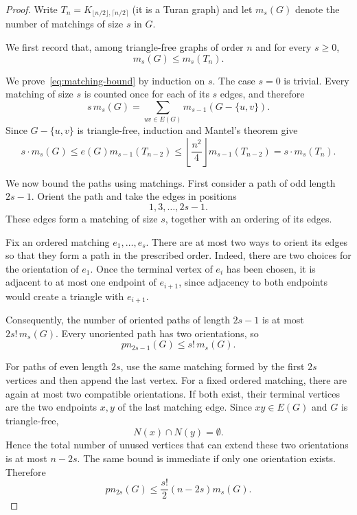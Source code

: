 \documentclass[10pt,a4paper]{amsart}
\newcommand{\pn}{pn}
\begin{document}
\begin{proof}
Write $T_n=K_{\lfloor n/2\rfloor,\lceil n/2\rceil}$ (it is a Turan graph)
and let $m_s(G)$ denote the number of matchings of size $s$ in $G$.

We first record that, among triangle-free graphs of order $n$ and for every $s\geq0$,
\begin{equation}\label{eq:matching-bound}
        m_s(G)\le m_s(T_n).
\end{equation}

We prove~\eqref{eq:matching-bound} by induction on $s$. The case $s=0$ is trivial. Every
matching of size $s$ is counted once for each of its $s$ edges, and
therefore
\[
 s\,m_s(G)
   =\sum_{uv\in E(G)}m_{s-1}(G-\{u,v\}).
\]
Since $G-\{u,v\}$ is triangle-free, induction and Mantel's theorem give
\[
 s \cdot m_s(G)
 \leq e(G)m_{s-1}(T_{n-2})
 \leq
 \left\lfloor\frac{n^2}{4}\right\rfloor
 m_{s-1}(T_{n-2})= s \cdot m_s(T_n).
\]


We now bound the paths using matchings. First consider a path of odd
length $2s-1$. Orient the path and take the edges in positions
\[
        1,3,\ldots,2s-1.
\]
These edges form a matching of size $s$, together with an ordering of
its edges.

Fix an ordered matching $e_1,\ldots,e_s$. There are at most two ways
to orient its edges so that they form a path in the prescribed order.
Indeed, there are two choices for the orientation of $e_1$. Once the
terminal vertex of $e_i$ has been chosen, it is adjacent to at most
one endpoint of $e_{i+1}$, since adjacency to both endpoints would
create a triangle with $e_{i+1}$.

Consequently, the number of oriented paths of length $2s-1$ is at most $2s!\,m_s(G).$
Every unoriented path has two orientations, so
\begin{equation}\label{eq:odd-path}
        \pn_{2s-1}(G)\leq s!\,m_s(G).
\end{equation}

For paths of even length $2s$, use the same matching formed by the
first $2s$ vertices and then append the last vertex. For a fixed
ordered matching, there are again at most two compatible orientations.
If both exist, their terminal vertices are the two endpoints $x,y$ of
the last matching edge. Since $xy\in E(G)$ and $G$ is triangle-free,
\[
        N(x)\cap N(y)=\emptyset.
\]
Hence the total number of unused vertices that can extend these two
orientations is at most $n-2s$. The same bound is immediate if only
one orientation exists. Therefore
\begin{equation}\label{eq:even-path}
        \pn_{2s}(G)
        \leq \frac{s!}{2}(n-2s)m_s(G).
\end{equation}


\end{proof}
\end{document}
